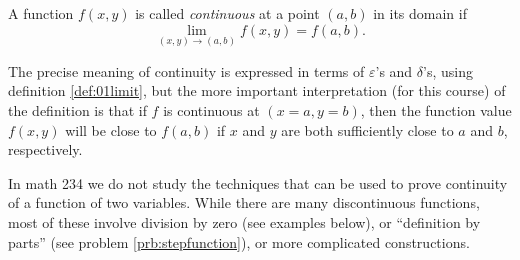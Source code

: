 \begin{definition}
  \label{sec:def-of-continuity}
  A function $f(x, y)$ is called \emph{continuous} at a point
  $(a,b)$ in its domain if 
  \[
  \lim_{(x,y) \to (a,b)} f(x, y) = f(a,b).
  \]
\end{definition}

The precise meaning of continuity is expressed in terms of
$\varepsilon$'s and $\delta$'s, using definition \ref{def:01limit},
but the more important interpretation (for this course) of the
definition is that if $f$ is continuous at $(x=a, y=b)$, then the
function value $f(x, y)$ will be close to $f(a, b)$ if $x$ and
$y$ are both sufficiently close to $a$ and $b$, respectively.

In math 234 we do not study the techniques that can be used to prove
continuity of a function of two variables.  While there are many
discontinuous functions, most of these involve division by zero (see
examples below), or ``definition by parts'' (see problem
\ref{prb:stepfunction}), or more complicated constructions.

\begin{figure}[th]\centering
\end{figure}

